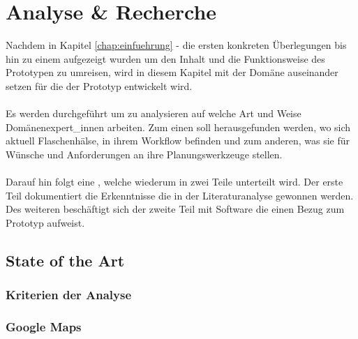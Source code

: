 \documentclass[../Bachelorarbeit.tex]{subfiles}
\begin{document}
\chapter{Analyse \& Recherche}
\label{chap:analyse}

Nachdem in Kapitel \ref{chap:einfuehrung} -  die ersten konkreten Überlegungen bis hin zu einem  aufgezeigt wurden um den Inhalt und die Funktionsweise des Prototypen zu umreisen, wird in diesem Kapitel mit der Domäne auseinander setzen für die der Prototyp entwickelt wird.\\
\\
Es werden  durchgeführt um zu analysieren auf welche Art und Weise  Domänenexpert\_innen arbeiten.
Zum einen soll herausgefunden werden, wo sich aktuell Flaschenhälse, in ihrem Workflow befinden und zum anderen, was sie für Wünsche und Anforderungen an ihre Planungswerkzeuge stellen.\\
\\
Darauf hin folgt eine , welche wiederum in zwei Teile unterteilt wird.
Der erste Teil dokumentiert die Erkenntnisse die in der Literaturanalyse gewonnen werden.
Des weiteren beschäftigt sich der zweite Teil mit Software die einen Bezug zum Prototyp aufweist.


\section{State of the Art}
\label{chap:analyse:sec:sota}


\subsection{Kriterien der Analyse}
\label{chap:analyse:sec:sota:sec:kriterien_der_analyse}


\subsection{Google Maps}
\label{chap:analyse:sec:sota:sec:google_maps}
\end{document}
